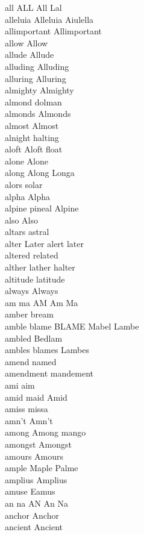 all ALL All Lal\\
alleluia Alleluia Aiulella\\
allimportant Allimportant\\
allow Allow\\
allude Allude\\
alluding Alluding\\
alluring Alluring\\
almighty Almighty\\
almond dolman\\
almonds Almonds\\
almost Almost\\
alnight halting\\
aloft Aloft float\\
alone Alone\\
along Along Longa\\
alors solar\\
alpha Alpha\\
alpine pineal Alpine\\
also Also\\
altars astral\\
alter Later alert later\\
altered related\\
alther lather halter\\
altitude latitude\\
always Always\\
am ma AM Am Ma\\
amber bream\\
amble blame BLAME Mabel Lambe\\
ambled Bedlam\\
ambles blames Lambes\\
amend named\\
amendment mandement\\
ami aim\\
amid maid Amid\\
amiss missa\\
amn't Amn't\\
among Among mango\\
amongst Amongst\\
amours Amours\\
ample Maple Palme\\
amplius Amplius\\
amuse Eamus\\
an na AN An Na\\
anchor Anchor\\
ancient Ancient\\
